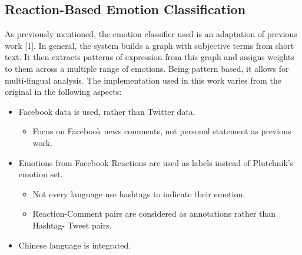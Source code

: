 \documentclass[12pt,a4paper]{report}
\theoremstyle{definition}
\begin{document}
\begin{CJK}{UTF8}{bsmi}
    \section{Reaction-Based Emotion Classification}
    \par As previously mentioned, the emotion classifier used is an adaptation of previous work [1]. In general, the system builds a graph with subjective terms from short text. It then extracts patterns of expression from this graph and assigns weights to them across a multiple range of emotions. Being pattern based, it allows for multi-lingual analysis. The implementation used in this work varies from the original in the following aspects:
    \begin{itemize}
        \item Facebook data is used, rather than Twitter data.
        \begin{itemize}
            \item Focus on Facebook news comments, not personal statement as previous 	work.
        \end{itemize}
        \item Emotions from Facebook Reactions are used as labels instead of Plutchnik’s emotion set.
        \begin{itemize}
            \item Not every language use hashtags to indicate their emotion.
            \item Reaction-Comment pairs are considered as annotations rather than Hashtag-	Tweet pairs.
        \end{itemize}
        \item Chinese language is integrated.
    \end{itemize}

\end{CJK}
\end{document}
